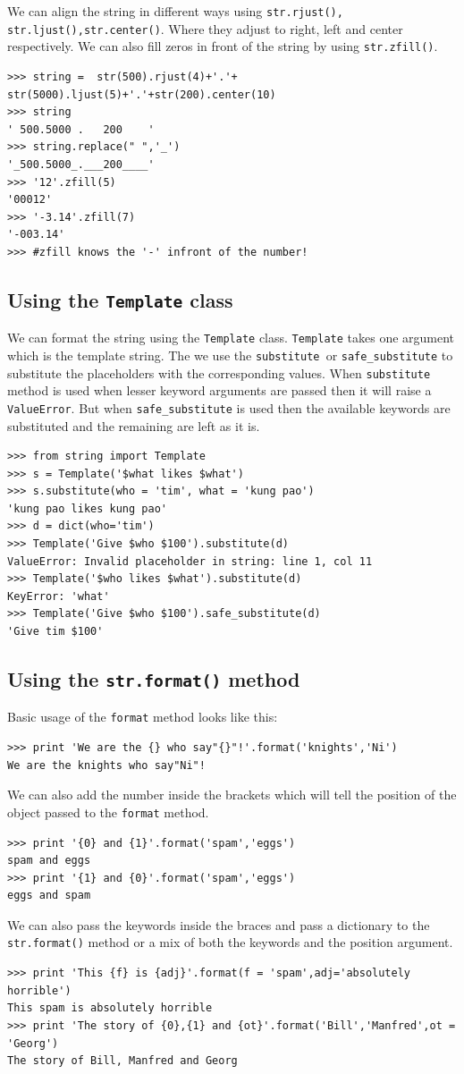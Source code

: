 \documentclass[12pt,a4paper]{article}
\begin{document}
We can align the string in different ways using \texttt{str.rjust(), str.ljust(),str.center()}. Where they adjust to right, left and center respectively.  We can also fill zeros in front   of the string by using \texttt{str.zfill()}. 

\begin{verbatim}
>>> string =  str(500).rjust(4)+'.'+ str(5000).ljust(5)+'.'+str(200).center(10)
>>> string
' 500.5000 .   200    '
>>> string.replace(" ",'_')
'_500.5000_.___200____'
>>> '12'.zfill(5)
'00012'
>>> '-3.14'.zfill(7)
'-003.14'
>>> #zfill knows the '-' infront of the number!
\end{verbatim}

\subsection{Using the \texttt{Template} class}
We can format the string using the \texttt{Template} class. \texttt{Template} takes one argument which is the template string. The we use the \texttt{substitute }or \texttt{safe\_substitute} to substitute the placeholders with the corresponding values. When \texttt{substitute} method is used when lesser keyword arguments are passed then it will raise a \texttt{ValueError}. But when \texttt{safe\_substitute} is used then the available keywords are substituted and the remaining are left as it is. 
\begin{verbatim}
>>> from string import Template
>>> s = Template('$what likes $what')
>>> s.substitute(who = 'tim', what = 'kung pao')
'kung pao likes kung pao'
>>> d = dict(who='tim')
>>> Template('Give $who $100').substitute(d)
ValueError: Invalid placeholder in string: line 1, col 11
>>> Template('$who likes $what').substitute(d)
KeyError: 'what'
>>> Template('Give $who $100').safe_substitute(d)
'Give tim $100'
\end{verbatim}
\subsection{Using the \texttt{str.format()} method}
Basic usage of the \texttt{format} method looks like this:
\begin{verbatim}
>>> print 'We are the {} who say"{}"!'.format('knights','Ni')
We are the knights who say"Ni"!
\end{verbatim}
We can also add the number inside the brackets which will tell the position of the object passed to the \texttt{format} method.
\begin{verbatim}
>>> print '{0} and {1}'.format('spam','eggs')
spam and eggs
>>> print '{1} and {0}'.format('spam','eggs')
eggs and spam
\end{verbatim}
We can also pass the keywords inside the braces and pass a dictionary to the \texttt{str.format()} method or a mix of both the keywords and the position argument.
\begin{verbatim}
>>> print 'This {f} is {adj}'.format(f = 'spam',adj='absolutely horrible')
This spam is absolutely horrible
>>> print 'The story of {0},{1} and {ot}'.format('Bill','Manfred',ot = 'Georg')
The story of Bill, Manfred and Georg
\end{verbatim}
\end{document}
